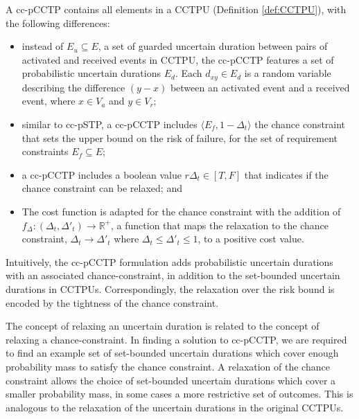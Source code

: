 \documentclass[jair,twoside,11pt,theapa]{article}
\begin{document}
\begin{mydef}
	A cc-pCCTP contains all elements in a CCTPU (Definition \ref{def:CCTPU}), with the following differences:
	
	\begin{itemize}
		\item instead of $E_u\subseteq E$, a set of guarded uncertain duration between pairs of
activated and received events in CCTPU, the cc-pCCTP features a set of probabilistic uncertain durations $E_d$. Each $d_{xy}\in
			E_d$ is a random variable describing the difference $(y-x)$ between an activated 
			event and a received event, where $x\in V_a$ and $y\in V_r$;
		\item similar to cc-pSTP, a cc-pCCTP includes $\langle E_f, 1 - \Delta_t\rangle$ the chance constraint that sets the upper bound on the risk of failure, for the set of requirement constraints $E_f\subseteq E$;
		
		\item a cc-pCCTP includes  a boolean value $r\Delta_t\in [T,F]$  that indicates if the chance constraint can be relaxed; and 
		
		\item 	The cost function is adapted for the chance constraint with the addition of  $f_\Delta:(\Delta_t,\Delta'_t)\rightarrow \mathbb{R}^+$, a function
						that maps the relaxation to the chance constraint, $\Delta_t\rightarrow
						\Delta'_t$ where $\Delta_t\leq \Delta'_t\leq 1$, to a positive cost value.
	\end{itemize}
	
\end{mydef}

Intuitively, the cc-pCCTP formulation adds probabilistic uncertain durations with an associated chance-constraint, in addition to the set-bounded uncertain durations in CCTPUs. Correspondingly, the relaxation over the risk bound is encoded by the tightness of the chance constraint. 

The concept of relaxing an uncertain duration is related to the concept of relaxing a chance-constraint. In finding a solution to cc-pCCTP, we are required to find an example set of set-bounded uncertain durations which cover enough probability mass to satisfy the chance constraint. A relaxation of the chance constraint allows the choice of set-bounded uncertain durations which cover a smaller probability mass, in some cases a more restrictive set of outcomes. This is analogous to the relaxation of the uncertain durations in the original CCTPUs.
\end{document}
